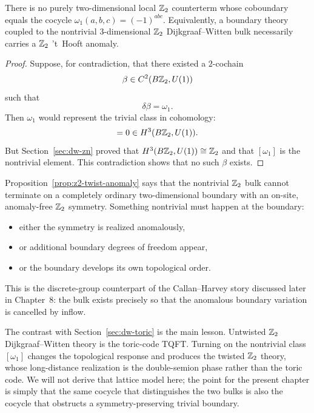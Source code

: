 \begin{proposition}\label{prop:z2-twist-anomaly}
There is no purely two-dimensional local $\mathbb{Z}_2$ counterterm whose coboundary equals the cocycle $\omega_1(a,b,c)=(-1)^{abc}$. Equivalently, a boundary theory coupled to the nontrivial $3$-dimensional $\mathbb{Z}_2$ Dijkgraaf--Witten bulk necessarily carries a $\mathbb{Z}_2$ 't~Hooft anomaly.
\end{proposition}

\begin{proof}
Suppose, for contradiction, that there existed a $2$-cochain
\begin{equation*}
\beta\in C^2(B\mathbb{Z}_2,U(1))
\end{equation*}
such that
\begin{equation*}
\delta\beta=\omega_1.
\end{equation*}
Then $\omega_1$ would represent the trivial class in cohomology:
\begin{equation*}
[\omega_1]=0\in H^3(B\Z_2,U(1)).
\end{equation*}
But Section~\ref{sec:dw-zn} proved that $H^3(B\mathbb{Z}_2,U(1))\cong \mathbb{Z}_2$ and that $[\omega_1]$ is the nontrivial element. This contradiction shows that no such $\beta$ exists.
\end{proof}

\begin{remark}\label{rem:z2-anomaly-physical}
Proposition~\ref{prop:z2-twist-anomaly} says that the nontrivial $\mathbb{Z}_2$ bulk cannot terminate on a completely ordinary two-dimensional boundary with an on-site, anomaly-free $\mathbb{Z}_2$ symmetry. Something nontrivial must happen at the boundary:
\begin{itemize}
\item either the symmetry is realized anomalously,
\item or additional boundary degrees of freedom appear,
\item or the boundary develops its own topological order.
\end{itemize}
This is the discrete-group counterpart of the Callan--Harvey story discussed later in Chapter~8: the bulk exists precisely so that the anomalous boundary variation is cancelled by inflow.
\end{remark}

\begin{remark}\label{rem:dw-z2-phases}
The contrast with Section~\ref{sec:dw-toric} is the main lesson. Untwisted $\mathbb{Z}_2$ Dijkgraaf--Witten theory is the toric-code TQFT. Turning on the nontrivial class $[\omega_1]$ changes the topological response and produces the twisted $\mathbb{Z}_2$ theory, whose long-distance realization is the double-semion phase rather than the toric code. We will not derive that lattice model here; the point for the present chapter is simply that the same cocycle that distinguishes the two bulks is also the cocycle that obstructs a symmetry-preserving trivial boundary.
\end{remark}

